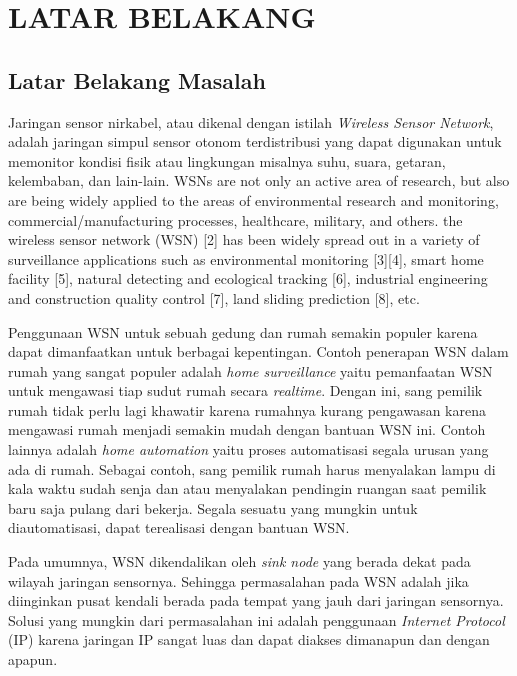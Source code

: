 
\chapter{LATAR BELAKANG}

\section{Latar Belakang Masalah}
Jaringan sensor nirkabel, atau dikenal dengan istilah \emph{Wireless Sensor Network}, adalah jaringan simpul sensor otonom terdistribusi yang dapat digunakan untuk memonitor kondisi fisik atau lingkungan misalnya suhu, suara, getaran, kelembaban, dan lain-lain. 
WSNs are not only an active area of research, but also are being widely applied to the areas of environmental research and monitoring, commercial/manufacturing processes, healthcare, military, and others.
the wireless sensor network (WSN) [2] has been widely spread out in a variety of surveillance applications such as environmental monitoring [3][4], smart home facility [5], natural detecting and ecological tracking [6], industrial engineering and construction quality control [7], land sliding prediction [8], etc.

Penggunaan WSN untuk sebuah gedung dan rumah semakin populer karena dapat dimanfaatkan untuk berbagai kepentingan. Contoh penerapan WSN dalam rumah yang sangat populer adalah \emph{home surveillance} yaitu pemanfaatan WSN untuk mengawasi tiap sudut rumah secara \emph{realtime}. Dengan ini, sang pemilik rumah tidak perlu lagi khawatir karena rumahnya kurang pengawasan karena mengawasi rumah menjadi semakin mudah dengan bantuan WSN ini. Contoh lainnya adalah \emph{home automation} yaitu proses automatisasi segala urusan yang ada di rumah. Sebagai contoh, sang pemilik rumah harus menyalakan lampu di kala waktu sudah senja dan atau menyalakan pendingin ruangan saat pemilik baru saja pulang dari bekerja. Segala sesuatu yang mungkin untuk diautomatisasi, dapat terealisasi dengan bantuan WSN.

Pada umumnya, WSN dikendalikan oleh \emph{sink node} yang berada dekat pada wilayah jaringan sensornya. Sehingga permasalahan pada WSN adalah jika diinginkan pusat kendali berada pada tempat yang jauh dari jaringan sensornya. Solusi yang mungkin dari permasalahan ini adalah penggunaan \emph{Internet Protocol} (IP) karena jaringan IP sangat luas dan dapat diakses dimanapun dan dengan apapun.

